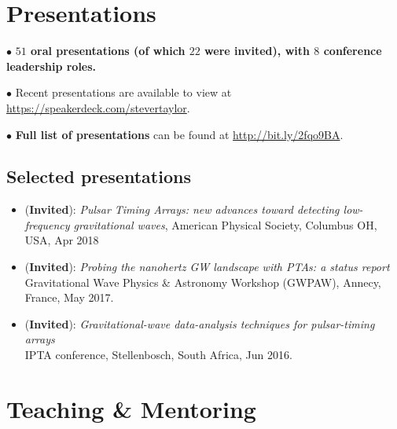 \documentclass[11pt,letterpaper,sans]{moderncv}
\begin{document}
\section{Presentations}

$\bullet$ \textbf{$51$ oral presentations (of which $22$ were invited), with $8$ conference leadership roles.}

$\bullet$ Recent presentations are available to view at {\color{color1} \href{https://speakerdeck.com/stevertaylor}{https://speakerdeck.com/stevertaylor}}.

$\bullet$ \textbf{Full list of presentations} can be found at {\color{color1} \href{http://bit.ly/2fqo9BA}{http://bit.ly/2fqo9BA}}.

\subsection{Selected presentations}

\begin{itemize}[leftmargin=8mm]

\item (\textbf{Invited}): \textit{Pulsar Timing Arrays: new advances toward detecting low-frequency gravitational waves}, American Physical Society, Columbus OH, USA, Apr 2018

\item (\textbf{Invited}): \textit{Probing the nanohertz GW landscape with PTAs: a status report} \\ Gravitational Wave Physics \& Astronomy Workshop (GWPAW), Annecy, France, May 2017.

\item (\textbf{Invited}): \textit{Gravitational-wave data-analysis techniques for pulsar-timing arrays} \\ IPTA conference, Stellenbosch, South Africa, Jun 2016.

\end{itemize}

\section{Teaching \& Mentoring}

\end{document}

